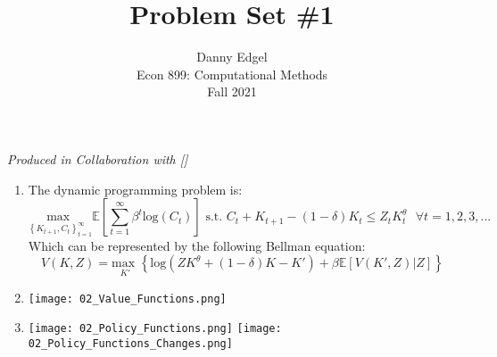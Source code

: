\documentclass{article}
\newcommand{\loge}[1]{\text{log}\left(#1\right)}
\newcommand{\usmax}[1]{\underset{#1}{\text{max }}}
\newcommand{\E}[1]{\mathbb{E}\left[#1\right]} %
\begin{document}
\title{	Problem Set \#1 }
\author{ 		Danny Edgel 						\\ 
			Econ 899: Computational Methods		\\
			Fall 2021						\\
		}
\maketitle\thispagestyle{empty}


\noindent\textit{Produced in Collaboration with []}


\begin{enumerate}
	\item The dynamic programming problem is:
	\[
		\usmax{\left\{K_{t+1}, C_t\right\}_{t=1}^\infty}\E{\sum_{t=1}^\infty\beta^t\loge{C_t}}
			\text{ s.t. }C_t + K_{t+1} - (1-\delta)K_t\leq Z_tK_t^\theta\text{ }\forall t = 1,2,3,...
	\]
	Which can be represented by the following Bellman equation:
	\[
		V(K,Z) = \usmax{K'}\left\{\loge{ZK^\theta + (1-\delta)K - K'} + \beta\E{V(K', Z)|Z}\right\}
	\]
	
	\item 
	\begin{center}
		\texttt{[image: 02\_Value\_Functions.png]}
	\end{center}
	
	\item 
	\begin{center}
		\texttt{[image: 02\_Policy\_Functions.png]}
		\texttt{[image: 02\_Policy\_Functions\_Changes.png]}
	\end{center}
	
\end{enumerate}

\end{document}
